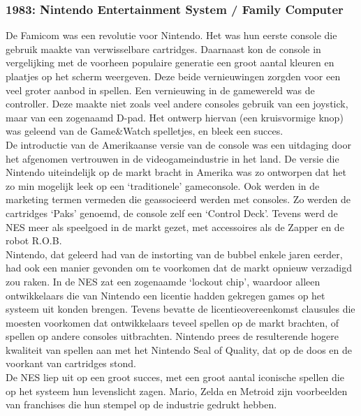 \documentclass{article}
\begin{document}
\subsubsection{1983: Nintendo Entertainment System / Family Computer}
De Famicom was een revolutie voor Nintendo. Het was hun eerste console die gebruik maakte van verwisselbare cartridges. Daarnaast kon de console in vergelijking met de voorheen populaire generatie een groot aantal kleuren en plaatjes op het scherm weergeven. Deze beide vernieuwingen zorgden voor een veel groter aanbod in spellen.
Een vernieuwing in de gamewereld was de controller. Deze maakte niet zoals veel andere consoles gebruik van een joystick, maar van een zogenaamd D-pad. Het ontwerp hiervan (een kruisvormige knop) was geleend van de Game\&Watch spelletjes, en bleek een succes. \\ 
De introductie van de Amerikaanse versie van de console was een uitdaging door het afgenomen vertrouwen in de videogameindustrie in het land. De versie die Nintendo uiteindelijk op de markt bracht in Amerika was zo ontworpen dat het zo min mogelijk leek op een `traditionele' gameconsole. Ook werden in de marketing termen vermeden die geassocieerd werden met consoles. Zo werden de cartridges `Paks' genoemd, de console zelf een `Control Deck'. Tevens werd de NES meer als speelgoed in de markt gezet, met accessoires als de Zapper en de robot R.O.B. \\ 
Nintendo, dat geleerd had van de instorting van de bubbel enkele jaren eerder, had ook een manier gevonden om te voorkomen dat de markt opnieuw verzadigd zou raken. In de NES zat een zogenaamde `lockout chip', waardoor alleen ontwikkelaars die van Nintendo een licentie hadden gekregen games op het systeem uit konden brengen. Tevens bevatte de licentieovereenkomst clausules die moesten voorkomen dat ontwikkelaars teveel spellen op de markt brachten, of spellen op andere consoles uitbrachten. Nintendo prees de resulterende hogere kwaliteit van spellen aan met het Nintendo Seal of Quality, dat op de doos en de voorkant van cartridges stond.\\ 
De NES liep uit op een groot succes, met een groot aantal iconische spellen die op het systeem hun levenslicht zagen. Mario, Zelda en Metroid zijn voorbeelden van franchises die hun stempel op de industrie gedrukt hebben.
\end{document}
